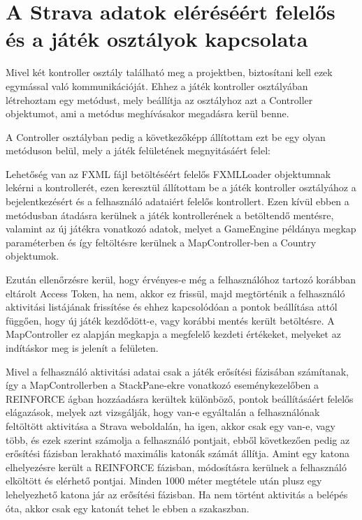 \section{A Strava adatok eléréséért felelős és a játék osztályok kapcsolata}

Mivel két kontroller osztály található meg a projektben, biztosítani kell ezek egymással való kommunikációját. Ehhez a játék kontroller osztályában létrehoztam egy metódust, mely beállítja az osztályhoz azt a Controller objektumot, ami a metódus meghívásakor megadásra kerül benne. 

A Controller osztályban pedig a következőképp állítottam ezt be egy olyan metóduson belül, mely a játék felületének megnyitásáért felel: 

 

Lehetőség van az FXML fájl betöltéséért felelős FXMLLoader objektumnak lekérni a kontrollerét, ezen keresztül állítottam be a játék kontroller osztályához a bejelentkezésért és a felhasználó adataiért felelős kontrollert. Ezen kívül ebben a metódusban átadásra kerülnek a játék kontrollerének a betöltendő mentésre, valamint az új játékra vonatkozó adatok, melyet a GameEngine példánya megkap paraméterben és így feltöltésre kerülnek a MapController-ben a Country objektumok. 

Ezután ellenőrzésre kerül, hogy érvényes-e még a felhasználóhoz tartozó korábban eltárolt Access Token, ha nem, akkor ez frissül, majd megtörténik a felhasználó aktivitási listájának frissítése és ehhez kapcsolódóan a pontok beállítása attól függően, hogy új játék kezdődött-e, vagy korábbi mentés került betöltésre. A MapController ez alapján megkapja a megfelelő kezdeti értékeket, melyeket az indításkor meg is jelenít a felületen. 

Mivel a felhasználó aktivitási adatai csak a játék erősítési fázisában számítanak, így a MapControllerben a StackPane-ekre vonatkozó eseménykezelőben a REINFORCE ágban hozzáadásra kerültek különböző, pontok beállításáért felelős elágazások, melyek azt vizsgálják, hogy van-e egyáltalán a felhasználónak feltöltött aktivitása a Strava weboldalán, ha igen, akkor csak egy van-e, vagy több, és ezek szerint számolja a felhasználó pontjait, ebből következően pedig az erősítési fázisban lerakható maximális katonák számát állítja. Amint egy katona elhelyezésre került a REINFORCE fázisban, módosításra kerülnek a felhasználó elköltött és elérhető pontjai. Minden 1000 méter megtétele után plusz egy lehelyezhető katona jár az erősítési fázisban. Ha nem történt aktivitás a belépés óta, akkor csak egy katonát tehet le ebben a szakaszban. 

